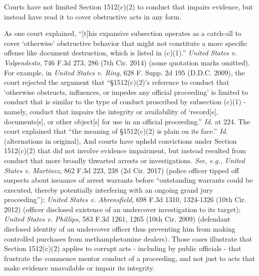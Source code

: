 Courts have not limited Section 1512(c)(2) to conduct that impairs evidence, but instead have read it to cover obstructive acts in any form.

As one court explained, “[t]his expansive subsection operates as a catch-all to cover ‘otherwise’ obstructive behavior that might not constitute a more specific offense like document destruction, which is listed in (c)(1).”
\textit{United States v. Volpendesto}, 746 F.3d 273, 286 (7th Cir. 2014) (some quotation marks omitted).
For example, in \textit{United States v. Ring}, 628 F. Supp. 2d 195 (D.D.C. 2009), the court rejected the argument that “\S 1512(c)(2)’s reference to conduct that ‘otherwise obstructs, influences, or impedes any official proceeding’ is limited to conduct that is similar to the type of conduct proscribed by subsection (c)(1) - namely, conduct that impairs the integrity or availability of ‘record[s], documents[s], or other object[s] for use in an official proceeding.”
\textit{Id.} at 224.
The court explained that “the meaning of \S 1512(c)(2) is plain on its face.”
\textit{Id.} (alternations in original), And courts have upheld convictions under Section 1512(c)(2) that did not involve evidence impairment, but instead resulted from conduct that more broadly thwarted arrests or investigations.
\textit{See, e.g., United States v. Martinez}, 862 F.3d 223, 238 (2d Cir. 2017) (police officer tipped off suspects about issuance of arrest warrants before “outstanding warrants could be executed, thereby potentially interfering with an ongoing grand jury proceeding”);
\textit{United States v. Ahrensfield}, 698 F.3d 1310, 1324-1326 (10th Cir. 2012) (officer disclosed existence of an undercover investigation to its target);
\textit{United States v. Phillips}, 583 F.3d 1261, 1265 (10th Cir. 2009) (defendant disclosed identity of an undercover officer thus preventing him from making controlled purchases from methamphetamine dealers).
Those cases illustrate that Section 1512(c)(2) applies to corrupt acts - including by public officials - that frustrate the commence mentor conduct of a proceeding, and not just to acts that make evidence unavailable or impair its integrity.

